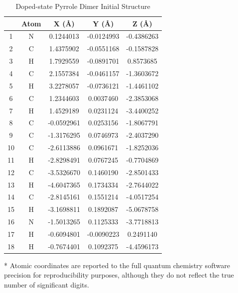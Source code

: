 \begin{table}[hbt!]\centering
\caption{Doped-state Pyrrole Dimer Initial Structure}
\renewcommand{\arraystretch}{1.5}
\begin{threeparttable}
\begin{tabular}{ccccc}\toprule
{} & {Atom} & {X (\AA)} & {Y (\AA)} & {Z (\AA)} \\ \midrule
    1  & N &  0.1244013 & -0.0124993 & -0.4386263\\
    2  & C &  1.4375902 & -0.0551168 & -0.1587828\\
    3  & H &  1.7929559 & -0.0891701 &  0.8573685\\
    4  & C &  2.1557384 & -0.0461157 & -1.3603672\\
    5  & H &  3.2278057 & -0.0736121 & -1.4461102\\
    6  & C &  1.2344603 &  0.0037460 & -2.3853068\\
    7  & H &  1.4529189 &  0.0231124 & -3.4400252\\
    8  & C & -0.0592961 &  0.0253156 & -1.8067791\\
    9  & C & -1.3176295 &  0.0746973 & -2.4037290\\
    10 & C & -2.6113886 &  0.0961671 & -1.8252036\\
    11 & H & -2.8298491 &  0.0767245 & -0.7704869\\
    12 & C & -3.5326670 &  0.1460190 & -2.8501433\\
    13 & H & -4.6047365 &  0.1734334 & -2.7644022\\
    14 & C & -2.8145161 &  0.1551214 & -4.0517254\\
    15 & H & -3.1698811 &  0.1892087 & -5.0678758\\
    16 & N & -1.5013265 &  0.1125333 & -3.7718813\\
    17 & H & -0.6094801 & -0.0090223 &  0.2491140\\
    18 & H & -0.7674401 &  0.1092375 & -4.4596173\\ \bottomrule
\end{tabular}
\begin{tablenotes}
\item[*] \footnotesize Atomic coordinates are reported to the full quantum chemistry software precision for reproducibility purposes, although they do not reflect the true number of significant digits.
\end{tablenotes}
\end{threeparttable}
\end{table}


